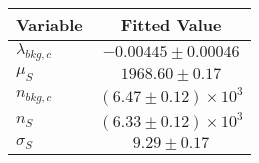 \begin{tabular}[t]{lc}
\hline
Variable &Fitted Value\\
\hline\hline
$\lambda_{bkg,c}$&$-0.00445\pm0.00046$\\
\hline
$\mu_{S}$&$1968.60\pm0.17$\\
\hline
$n_{bkg,c}$&$(6.47\pm0.12)\times 10^3$\\
\hline
$n_{S}$&$(6.33\pm0.12)\times 10^3$\\
\hline
$\sigma_{S}$&$9.29\pm0.17$\\
\hline
\end{tabular}